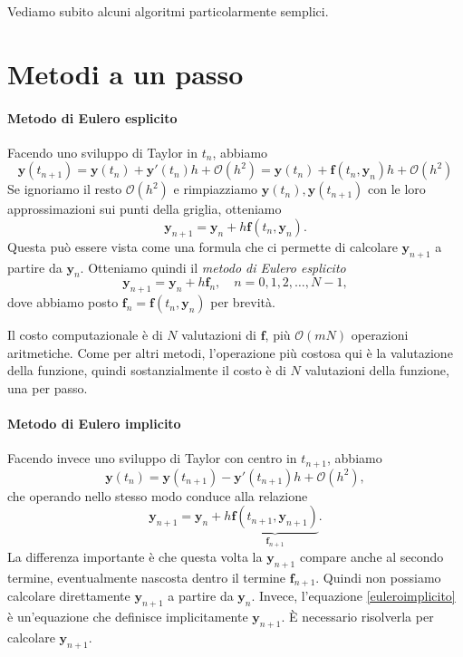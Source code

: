 \documentclass[a4paper]{report}
\theoremstyle{definiton}
\theoremstyle{remark}
\newcommand{\y}{\mathbf{y}}
\newcommand{\f}{\mathbf{f}}
\begin{document}
Vediamo subito alcuni algoritmi particolarmente semplici.

\section{Metodi a un passo}

\paragraph{Metodo di Eulero esplicito}

Facendo uno sviluppo di Taylor in $t_n$, abbiamo
\begin{equation} \label{euleroesp_taylor}
    \y(t_{n+1}) = \y(t_n) + \y'(t_n)h + \mathcal{O}(h^2) = \y(t_n) + \f(t_n, \y_n)h + \mathcal{O}(h^2)
\end{equation}
Se ignoriamo il resto $\mathcal{O}(h^2)$ e rimpiazziamo $\y(t_n), \y(t_{n+1})$ con le loro approssimazioni sui punti della griglia, otteniamo
\[
\y_{n+1} = \y_n + h \f(t_n, \y_n).
\]
Questa può essere vista come una formula che ci permette di calcolare $\y_{n+1}$ a partire da $\y_n$. Otteniamo quindi il \emph{metodo di Eulero esplicito}
\begin{equation} \label{euleroesplicito}
    \y_{n+1} = \y_n + h \f_n, \quad n = 0,1,2,\dots,N-1,
\end{equation}
dove abbiamo posto $\f_n = \f(t_n, \y_n)$ per brevità.

Il costo computazionale è di $N$ valutazioni di $\f$, più $\mathcal{O}(mN)$ operazioni aritmetiche. Come per altri metodi, l'operazione più costosa qui è la valutazione della funzione, quindi sostanzialmente il costo è di $N$ valutazioni della funzione, una per passo.

\paragraph{Metodo di Eulero implicito}

Facendo invece uno sviluppo di Taylor con centro in $t_{n+1}$, abbiamo
\[
\y(t_n) = \y(t_{n+1}) - \y'(t_{n+1})h + \mathcal{O}(h^2),
\]
che operando nello stesso modo conduce alla relazione
\begin{equation} \label{euleroimplicito}
    \y_{n+1} = \y_n + h \underbrace{\f(t_{n+1}, \y_{n+1})}_{\f_{n+1}}.    
\end{equation}
La differenza importante è che questa volta la $\y_{n+1}$ compare anche al secondo termine, eventualmente nascosta dentro il termine $\f_{n+1}$. Quindi non possiamo calcolare direttamente $\y_{n+1}$ a partire da $\y_n$. Invece, l'equazione \eqref{euleroimplicito} è un'equazione che definisce implicitamente $\y_{n+1}$. È necessario risolverla per calcolare $\y_{n+1}$. 
\end{document}
